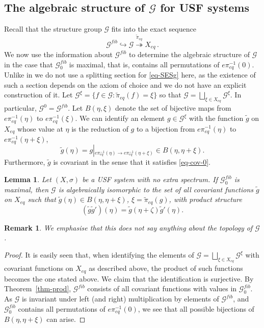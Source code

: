 \documentclass[10pt,a4paper]{amsart}
\newtheorem{lemma}[theorem]{Lemma}
\newtheorem{remark}[theorem]{Remark}
\numberwithin{equation}{section}
\newcommand{\Gg}{{\mathcal G}}
\newcommand{\Xe}{X_{eq}}
\newcommand{\pe}{\pi_{eq}}
\begin{document}
\subsection{The algebraic structure of $\Gg$ for USF systems}  
Recall that the structure group $\Gg$ fits into the exact sequence
\begin{equation}\label{eq-SESg}
\Gg^{fib} \hookrightarrow  \Gg \stackrel{\widetilde\pe} \twoheadrightarrow \Xe \, .
\end{equation}
We now use the information about $\Gg^{fib}$ to determine the algebraic structure of $\Gg$ in the case that $\Gg_0^{fib}$ is maximal, that is, contains all permutations of $e\pe^{-1}(0)$. Unlike in \cite{ESBS} we do not use a splitting section for \eqref{eq-SESg} here, as the existence of such a section depends on  the axiom of choice and we do not have an explicit construction of it. 
Let $\Gg^\xi = \{f\in \Gg: \widetilde\pe (f) = \xi\}$ so that $\Gg = \bigsqcup_{\xi\in \Xe} \Gg^\xi$. In particular, $\Gg^0=\Gg^{fib}$.
Let $B(\eta,\xi)$ denote the set of bijective maps from $e\pe^{-1}(\eta)$ to $e\pe^{-1}(\xi)$. We can identify an element $g\in \Gg^\xi$ with the function $\tilde g$ on $\Xe$ whose value at $\eta$ is the reduction of  $g$ to  
a bijection from $e\pe^{-1}(\eta)$ to $e\pe^{-1}(\eta+\xi)$,
$$\tilde g(\eta) = g\left|_{ e\pe^{-1}(\eta)\to e\pe^{-1}(\eta+\xi)}\right.  \in B(\eta,\eta+\xi).$$
Furthermore, $\tilde g$ is covariant in the sense that it satisfies \eqref{eq-cov-0}. 
\begin{lemma}\label{lem-alg-iso}
Let $(X,\sigma)$ be a USF system with no extra spectrum. If  $\Gg_0^{fib}$ is maximal, then
 $\Gg$ is algebraically isomorphic to the set of all covariant functions $\tilde g$ on $\Xe$ such that $\tilde g(\eta) \in B(\eta,\eta+\xi)$, $\xi= \widetilde\pe (g)$,
with product structure 
$$(\tilde g\tilde g')(\eta) = \tilde g(\eta+\zeta) \tilde g'(\eta).$$
\end{lemma}
\begin{remark}We emphasise that this does not say anything about the topology of $\Gg$. \end{remark}
\begin{proof} 
It is easily seen that,
when identifying the elements of $\Gg = \bigsqcup_{\xi\in \Xe} \Gg^\xi$ 
with covariant functions on $\Xe$ as described above, the product of such functions becomes the one stated above. We claim that the identification is surjective. 
 By Theorem~\ref{thm-prod},  $\Gg^{fib}$ consists of all covariant functions with values in $\Gg_0^{fib}$. 
As $\Gg$ is invariant under left (and right) multiplication by elements of $\Gg^{fib}$, and $\Gg_0^{fib}$ contains all  permutations of $e\pe^{-1}(0)$, we see that all possible bijections of $B(\eta,\eta+\xi)$ can arise. 
\end{proof}
\end{document}

